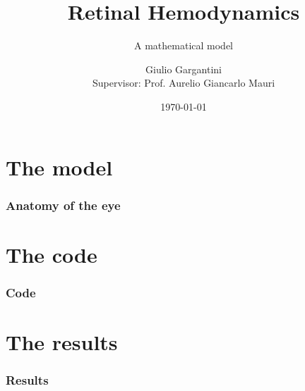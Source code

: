 \documentclass{beamer}
\title{Retinal Hemodynamics}
\subtitle{A mathematical model}
\author[G. Gargantini]{Giulio Gargantini \\[1ex]  {\small Supervisor: Prof. Aurelio Giancarlo Mauri}}
\institute[PoliMI]{Computational Modeling in Electronics and Biomathematics \\[1ex]  {\small Politecnico di Milano}}
\date{\today}
\begin{document}
\begin{frame}
\titlepage
\end{frame}

\section{The model}

\begin{frame}
\frametitle{Anatomy of the eye}
\end{frame}

\section{The code}
\begin{frame}
\frametitle{Code}
\end{frame}

\section{The results}
\begin{frame}
\frametitle{Results}
\end{frame}
\end{document}
